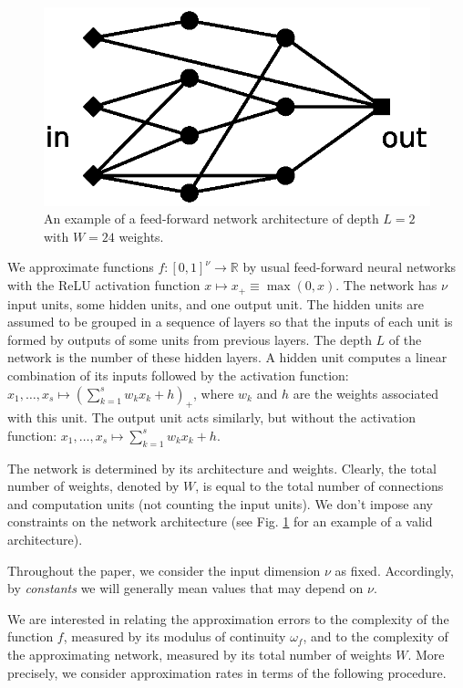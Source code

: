 \documentclass[final, 12pt]{colt2018}
\begin{document}
\begin{figure}
\begin{center}
\includegraphics[clip,trim=12mm 8mm 12mm 8mm, scale=0.5]{netGray.eps}
\caption{An example of a feed-forward network architecture of depth $L=2$ with $W=24$ weights.}\label{fig:net}
\end{center}
\end{figure}

We approximate functions $f:[0,1]^\nu\to\mathbb R$ by usual feed-forward neural networks with the ReLU activation function $x\mapsto x_+\equiv \max(0,x)$.  The network has $\nu$ input units, some hidden units, and one output unit. The hidden units are assumed to be grouped in a sequence of layers so that the inputs of each unit is formed by outputs of some units from previous layers. The depth $L$ of the network is the number of these hidden layers. A hidden unit computes a linear combination of its inputs followed by the activation function: $x_1,\ldots,x_s\mapsto (\sum_{k=1}^s w_k x_k+h)_+$, where $w_k$ and $h$ are the weights associated with this unit. The output unit acts similarly, but without the activation function: $x_1,\ldots,x_s\mapsto \sum_{k=1}^s w_k x_k+h$. 

The network is determined by its architecture and weights. Clearly, the total number of weights, denoted by $W$, is equal to the total number of connections and computation units (not counting the input units). We don't impose any constraints on the network architecture (see Fig. \ref{fig:net} for an example of a valid architecture). 

Throughout the paper, we consider the input dimension $\nu$ as fixed. Accordingly, by \emph{constants} we will generally mean values that may depend on $\nu$.

We are interested in relating the approximation errors to the complexity of the function $f$, measured by its modulus of continuity $\omega_f$, and to the complexity of the approximating network, measured by its total number of weights $W$. More precisely, we consider  approximation rates in terms of the following procedure. 
\end{document}
